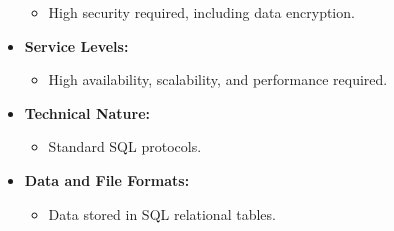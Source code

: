 \begin{itemize}
\begin{itemize}
              \item High security required, including data encryption.
          \end{itemize}
    \item \textbf{Service Levels:}
          \begin{itemize}
              \item High availability, scalability, and performance required.
          \end{itemize}
    \item \textbf{Technical Nature:}
          \begin{itemize}
              \item Standard SQL protocols.
          \end{itemize}
    \item \textbf{Data and File Formats:}
          \begin{itemize}
              \item Data stored in SQL relational tables.
          \end{itemize}
\end{itemize}

